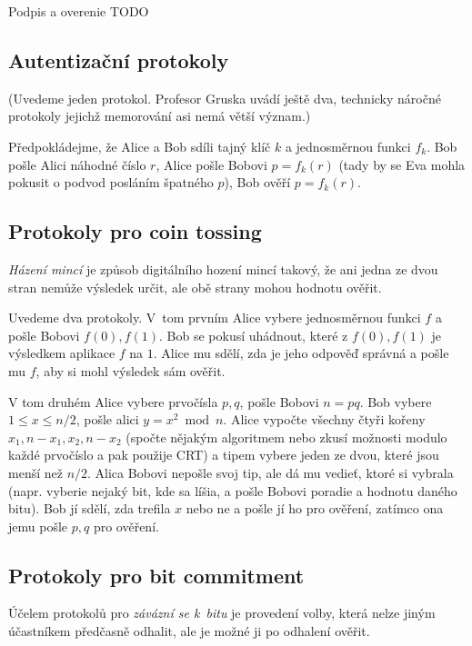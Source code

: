 Podpis a overenie TODO

\subsection{Autentizační protokoly}

(Uvedeme jeden protokol. Profesor Gruska uvádí ještě dva, technicky
náročné protokoly jejichž memorování asi nemá větší význam.)

\begin{example}
Předpokládejme, že Alice a Bob sdíli tajný klíč $k$ a jednosměrnou
funkci $f_k$. Bob pošle Alici náhodné číslo $r$, Alice pošle Bobovi
$p = f_k(r)$ (tady by se Eva mohla pokusit o podvod posláním špatného
$p$), Bob ověří $p = f_k(r)$.
\end{example}

\subsection{Protokoly pro coin tossing}

{\em Házení mincí} je způsob digitálního hození mincí takový, že ani
jedna ze dvou stran nemůže výsledek určit, ale obě strany mohou hodnotu
ověřit.

Uvedeme dva protokoly. V~tom prvním Alice vybere jednosměrnou funkci $f$
a pošle Bobovi $f(0), f(1)$. Bob se pokusí uhádnout, které z $f(0), f(1)$
je výsledkem aplikace $f$ na $1$. Alice mu sdělí, zda je jeho odpověď
správná a pošle mu $f$, aby si mohl výsledek sám ověřit.

V tom druhém Alice vybere prvočísla $p,q$, pošle Bobovi $n = pq$.
Bob vybere $1 \leq x \leq n/2$, pošle alici $y = x^2 \bmod n$.
Alice vypočte všechny čtyři kořeny $x_1, n-x_1, x_2, n - x_2$ (spočte
nějakým algoritmem nebo zkusí možnosti modulo každé prvočíslo a pak použije CRT)
a tipem vybere jeden ze dvou,
které jsou menší než $n/2$.
Alica Bobovi nepošle svoj tip, ale dá mu vedieť, ktoré si vybrala (napr. 
vyberie nejaký bit, kde sa líšia, a pošle Bobovi poradie a hodnotu 
daného bitu).
Bob jí sdělí, zda trefila $x$ nebo ne a
pošle jí ho pro ověření, zatímco ona jemu pošle $p,q$ pro ověření.


\subsection{Protokoly pro bit commitment}

Účelem protokolů pro {\em závázní se k~bitu} je provedení volby, která
nelze jiným účastníkem předčasně odhalit, ale je možné ji po odhalení
ověřit.

